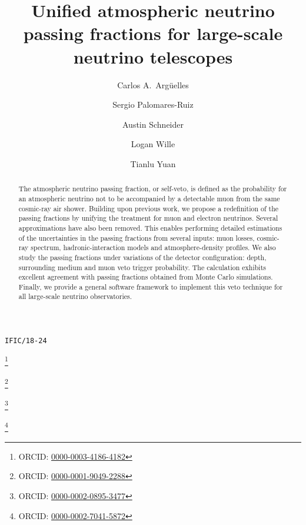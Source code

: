 \documentclass[aps,prd,showpacs,letterpaper,onecolumn,longbibliography,superscriptaddress,notitlepage,nofootinbib]{revtex4-1}%
\begin{document}
\hfill{\tt IFIC/18-24}
\vskip 0.2in

\title{Unified atmospheric neutrino passing fractions for large-scale neutrino telescopes}

\author{Carlos A.~Arg\"uelles}
\thanks{ORCID: \href{https://orcid.org/0000-0003-4186-4182}{0000-0003-4186-4182}}
\author{Sergio Palomares-Ruiz}
\thanks{ORCID: \href{https://orcid.org/0000-0001-9049-2288}{0000-0001-9049-2288}}
\author{Austin Schneider} 
\thanks{ORCID: \href{https://orcid.org/0000-0002-0895-3477}{0000-0002-0895-3477}}
\author{Logan Wille}
\author{Tianlu Yuan}
\thanks{ORCID: \href{http://orcid.org/0000-0002-7041-5872}{0000-0002-7041-5872}}

\begin{abstract}
The atmospheric neutrino passing fraction, or self-veto, is defined as the probability for an atmospheric neutrino not to be accompanied by a detectable muon from the same cosmic-ray air shower. Building upon previous work, we propose a redefinition of the passing fractions by unifying the treatment for muon and electron neutrinos. Several approximations have also been removed. This enables performing detailed estimations of the uncertainties in the passing fractions from several inputs: muon losses, cosmic-ray spectrum, hadronic-interaction models and atmosphere-density profiles. We also study the passing fractions under variations of the detector configuration: depth, surrounding medium and muon veto trigger probability. The calculation exhibits excellent agreement with passing fractions obtained from Monte Carlo simulations. Finally, we provide a general software framework to implement this veto technique for all large-scale neutrino observatories.
\end{abstract}
\end{document}
